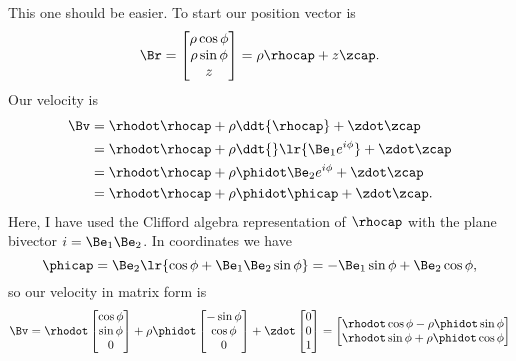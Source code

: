 {%
%
This one should be easier.  To start our position vector is
%
\begin{equation}\label{eqn:classicalMechanicsPs2:90}
\Br =
\begin{bmatrix}
\rho \cos\phi \\
\rho \sin\phi \\
z
\end{bmatrix}
= \rho \rhocap + z \zcap.
\end{equation}
%
Our velocity is
%
\begin{equation}\label{eqn:classicalMechanicsPs2:1110}
\begin{aligned}
\Bv
&= \rhodot \rhocap + \rho \ddt{\rhocap} + \zdot \zcap \\
&= \rhodot \rhocap + \rho \ddt{}
\lr{ \Be_1 e^{i\phi} }
 + \zdot \zcap \\
&= \rhodot \rhocap + \rho \phidot \Be_2 e^{i\phi} + \zdot \zcap \\
&= \rhodot \rhocap + \rho \phidot \phicap + \zdot \zcap .
\end{aligned}
\end{equation}
%
Here, I have used the Clifford algebra representation of \(\rhocap\) with the plane bivector \(i = \Be_1 \Be_2\).  In coordinates we have
%
\begin{dmath}\label{eqn:classicalMechanicsPs2:110}
\phicap = \Be_2
\lr{ \cos\phi + \Be_1 \Be_2 \sin\phi }
 = -\Be_1 \sin\phi + \Be_2 \cos\phi,
\end{dmath}
%
so our velocity in matrix form is
\begin{dmath}\label{eqn:classicalMechanicsPs2:130}
\Bv = \rhodot
\begin{bmatrix}
\cos\phi \\
\sin\phi \\
0
\end{bmatrix}
+
\rho \phidot
\begin{bmatrix}
-\sin\phi \\
\cos\phi \\
0
\end{bmatrix}
+
\zdot
\begin{bmatrix}
0 \\
0 \\
1
\end{bmatrix}
=
\begin{bmatrix}
\rhodot \cos\phi - \rho \phidot \sin\phi \\
\rhodot \sin\phi + \rho \phidot \cos\phi \\

\end{bmatrix}
\end{dmath}}
